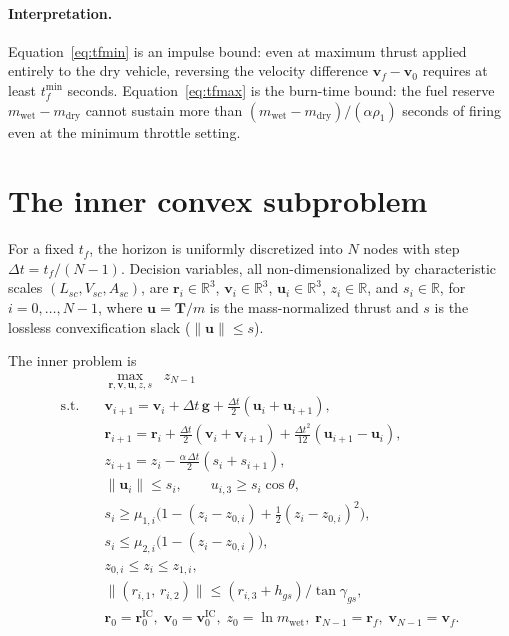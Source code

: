 \documentclass[11pt]{article}
\newcommand{\R}{\mathbb{R}}
\begin{document}
\paragraph{Interpretation.} Equation~\eqref{eq:tfmin} is an impulse bound:
even at maximum thrust applied entirely to the dry vehicle, reversing the
velocity difference $\bm{v}_f - \bm{v}_0$ requires at least $t_f^{\min}$
seconds. Equation~\eqref{eq:tfmax} is the burn-time bound: the fuel reserve
$m_{\text{wet}} - m_{\text{dry}}$ cannot sustain more than
$(m_{\text{wet}}-m_{\text{dry}})/(\alpha\rho_1)$ seconds of firing even at the
minimum throttle setting.

\section{The inner convex subproblem}

For a fixed $t_f$, the horizon is uniformly discretized into $N$ nodes with
step $\Delta t = t_f/(N-1)$. Decision variables, all non-dimensionalized by
characteristic scales $(L_{sc}, V_{sc}, A_{sc})$, are
$\bm{r}_i \in \R^3$, $\bm{v}_i \in \R^3$, $\bm{u}_i \in \R^3$,
$z_i \in \R$, and $s_i \in \R$, for $i = 0, \dots, N-1$, where
$\bm{u} = \bm{T}/m$ is the mass-normalized thrust and $s$ is the lossless
convexification slack ($\lVert \bm{u}\rVert \le s$).

The inner problem is
\begin{equation}
\begin{aligned}
  &\max_{\bm{r},\bm{v},\bm{u},z,s} \;\; z_{N-1} \\
  \text{s.t.}\quad
    & \bm{v}_{i+1} = \bm{v}_i + \Delta t \,\bm{g} + \tfrac{\Delta t}{2}(\bm{u}_i + \bm{u}_{i+1}),\\
    & \bm{r}_{i+1} = \bm{r}_i + \tfrac{\Delta t}{2}(\bm{v}_i + \bm{v}_{i+1})
                    + \tfrac{\Delta t^2}{12}(\bm{u}_{i+1} - \bm{u}_i),\\
    & z_{i+1} = z_i - \tfrac{\alpha\,\Delta t}{2}(s_i + s_{i+1}),\\
    & \lVert \bm{u}_i \rVert \le s_i, \qquad u_{i,3} \ge s_i \cos\theta,\\
    & s_i \ge \mu_{1,i}\bigl(1 - (z_i - z_{0,i}) + \tfrac{1}{2}(z_i - z_{0,i})^2\bigr),\\
    & s_i \le \mu_{2,i}\bigl(1 - (z_i - z_{0,i})\bigr),\\
    & z_{0,i} \le z_i \le z_{1,i},\\
    & \lVert (r_{i,1},\,r_{i,2}) \rVert \le (r_{i,3} + h_{gs})/\tan\gamma_{gs},\\
    & \bm{r}_0 = \bm{r}_0^{\text{IC}},\; \bm{v}_0 = \bm{v}_0^{\text{IC}},\;
      z_0 = \ln m_{\text{wet}},\;
      \bm{r}_{N-1} = \bm{r}_f,\; \bm{v}_{N-1} = \bm{v}_f.
\end{aligned}
\label{eq:inner}
\end{equation}
\end{document}
